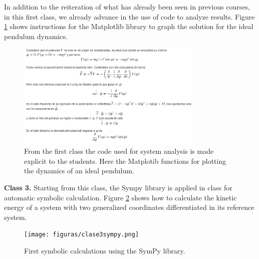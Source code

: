 In addition to the reiteration of what has already been seen in previous courses, in this first class, we already advance in the use of code to analyze results. Figure \ref{fig:clase1graficos} shows instructions for the Matplotlib library to graph the solution for the ideal pendulum dynamics.

\begin{figure}[!ht]
	\centering
	\includegraphics[width=3.5in]{figuras/clase1péndulo.png}
	\caption{
		From the first class the code used for system analysis is made explicit to the students.
		Here the Matplotib functions for plotting the dynamics of an ideal pendulum.
	}
	\label{fig:clase1graficos}
\end{figure}







\textbf{Class 3.} Starting from this class, the Sympy library is applied in class for automatic symbolic calculation. Figure \ref{fig:clase3sympy} shows how to calculate the kinetic energy of a system with two generalized coordinates differentiated in its reference system.

\begin{figure}[!ht]
\centering
\texttt{[image: figuras/clase3sympy.png]}
\caption{First symbolic calculations using the SymPy library.}
\label{fig:clase3sympy}
\end{figure}



